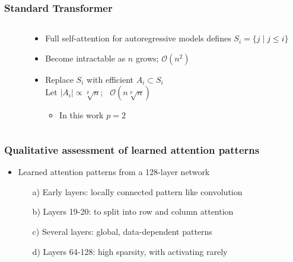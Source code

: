 \documentclass[dvipdfmx]{beamer}
\begin{document}
\begin{frame}
    \frametitle{Standard Transformer}
    \begin{columns}
        \begin{column}[T]{0.325\textwidth}
        \end{column}
        \begin{column}[T]{0.675\textwidth}
            \begin{itemize}
                \item Full self-attention for autoregressive models defines $S_i = \{ j \mid j \leq i \}$
                \item Become intractable as $n$ grows; $\mathcal{O}(n^2)$
                \item Replace $S_i$ with efficient $A_i \subset S_i$ \\
                    Let $|A_i| \propto \sqrt[p]{n}$; \ $\mathcal{O}(n \sqrt[p]{n})$
                    \begin{itemize}
                        \item In this work $p = 2$
                    \end{itemize}
            \end{itemize}
        \end{column}
    \end{columns}
\end{frame}


\begin{frame}
    \frametitle{Qualitative assessment of learned attention patterns}
    \begin{itemize}
        \item Learned attention patterns from a 128-layer network
        \begin{itemize}
            \item[a)] Early layers: locally connected pattern like convolution
            \item[b)] Layers 19-20: to split into row and column attention
            \item[c)] Several layers: global, data-dependent patterns
            \item[d)] Layers 64-128: high sparsity, with activating rarely
        \end{itemize}
    \end{itemize}
\end{frame}
\end{document}
